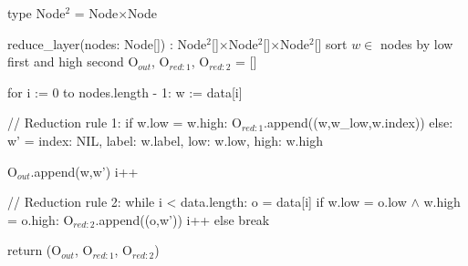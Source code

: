 \begin{blstlisting}
  type Node$^2$ = Node$\times$Node

  reduce_layer(nodes: Node[]) : Node$^2$[]$\times$Node$^2$[]$\times$Node$^2$[]
    sort $w \in $ nodes by low first and high second
    O$_{\mathit{out}}$, O$_{\mathit{red:}1}$, O$_{\mathit{red:}2}$ = []

    for i := 0 to nodes.length - 1:
      w := data[i]

      // Reduction rule 1:
      if w.low = w.high:
        O$_{\mathit{red:}1}$.append((w,w_low,w.index))
      else:
        w' = {
          index: NIL,
          label: w.label,
          low: w.low,
          high: w.high
        }

        O$_{\mathit{out}}$.append(w,w')
        i++

        // Reduction rule 2:
        while i < data.length:
          o = data[i]
          if w.low = o.low $\land$ w.high = o.high:
            O$_{\mathit{red:}2}$.append((o,w'))
            i++
          else break

    return (O$_{\mathit{out}}$, O$_{\mathit{red:}1}$, O$_{\mathit{red:}2}$)
\end{blstlisting}
